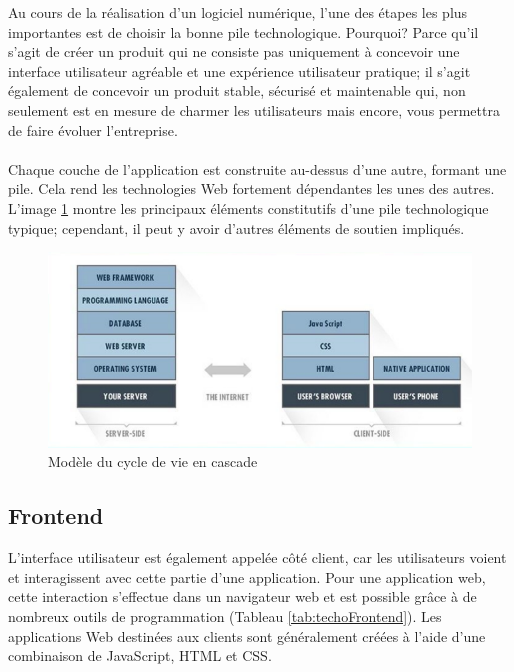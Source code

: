 Au cours de la réalisation d'un logiciel numérique,
        l'une des étapes les plus importantes est de choisir la bonne pile technologique. 
        Pourquoi? Parce qu'il s'agit de créer un produit qui ne consiste pas uniquement
        à concevoir une interface utilisateur agréable et une expérience utilisateur 
        pratique; il s'agit également de concevoir un produit stable, sécurisé et 
        maintenable qui, non seulement est en mesure de charmer les utilisateurs mais encore, vous 
        permettra de faire évoluer l'entreprise.
        \paragraph{}
        Chaque couche de l'application est construite au-dessus d'une autre, 
        formant une pile. Cela rend les technologies Web fortement dépendantes 
        les unes des autres. L'image \ref{fig:pile} montre les principaux éléments constitutifs 
        d'une pile technologique typique; cependant, il peut y avoir d'autres éléments de 
        soutien impliqués.
        \begin{figure}[t]
                \centering
                \includegraphics[scale=0.5]{images/Implementation/pile.png}
                \caption{Modèle du cycle de vie en cascade \cite{Bulatovych}}
                \label{fig:pile}
        \end{figure}
        \subsection{Frontend}
        L'interface utilisateur est également appelée côté client, car les utilisateurs voient et interagissent 
        avec cette partie d'une application. Pour une application web, cette interaction s'effectue 
        dans un navigateur web et est possible grâce à de nombreux outils de programmation (Tableau \ref{tab:techoFrontend}). 
        Les applications Web destinées aux clients sont généralement créées à l'aide d'une combinaison 
        de JavaScript, HTML et CSS.
